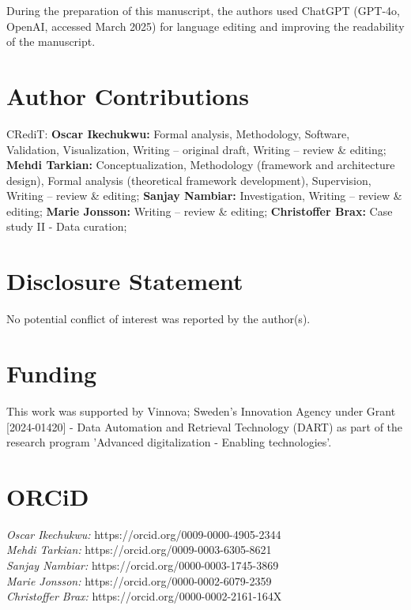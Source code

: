 \documentclass[largeformat]{interact}
\begin{document}
\noindent During the preparation of this manuscript, the authors used ChatGPT (GPT-4o, OpenAI, accessed March 2025) for language editing and improving the readability of the manuscript.
\section*{Author Contributions}
CRediT: \textbf{Oscar Ikechukwu:} Formal analysis, Methodology, Software, Validation, Visualization, Writing -- original draft, Writing -- review \& editing; \textbf{Mehdi Tarkian:} Conceptualization, Methodology (framework and architecture design), Formal analysis (theoretical framework development), Supervision, Writing -- review \& editing; \textbf{Sanjay Nambiar:} Investigation, Writing -- review \& editing; \textbf{Marie Jonsson:} Writing -- review \& editing; \textbf{Christoffer Brax:} Case study II - Data curation;

\section*{Disclosure Statement}
No potential conflict of interest was reported by the author(s).
\section*{Funding}
\noindent This work was supported by Vinnova; Sweden's Innovation Agency under Grant [2024-01420] - Data Automation and Retrieval Technology (DART) as part of the research program 'Advanced digitalization - Enabling technologies'.
\section*{ORCiD}
\textit{Oscar Ikechukwu:}   https://orcid.org/0009-0000-4905-2344\\
\textit{Mehdi Tarkian:}   https://orcid.org/0009-0003-6305-8621\\
\textit{Sanjay Nambiar:}   https://orcid.org/0000-0003-1745-3869\\
\textit{Marie Jonsson:}  https://orcid.org/0000-0002-6079-2359\\
\textit{Christoffer Brax:}  https://orcid.org/0000-0002-2161-164X
\end{document}
